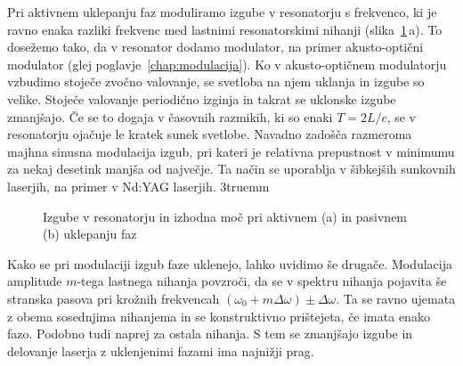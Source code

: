 Pri aktivnem uklepanju faz moduliramo izgube v resonatorju
s frekvenco, ki je ravno enaka razliki 
frekvenc med lastnimi resonatorskimi nihanji (slika~\ref{fig:aktpas}\,a). 
To dosežemo tako, da v resonator dodamo
modulator, na primer akusto-optični modulator (glej poglavje~\ref{chap:modulacija}).
Ko v akusto-optičnem modulatorju vzbudimo stoječe zvočno valovanje, se 
svetloba na njem uklanja in izgube so velike. Stoječe valovanje periodično izginja
in takrat se uklonske izgube zmanjšajo. Če se to dogaja v časovnih
razmikih, ki so enaki $T=2L/c$, se v resonatorju ojačuje le kratek sunek svetlobe. 
Navadno zadošča razmeroma majhna sinusna modulacija izgub, pri kateri je relativna 
prepustnost v minimumu za nekaj desetink manjša od največje. Ta način se uporablja
v šibkejših sunkovnih laserjih, na primer v Nd:YAG laserjih.
\vglue3truemm
\begin{figure}[ht]
\centering
\def\svgwidth{128truemm} 

\caption{Izgube v resonatorju in izhodna moč pri aktivnem (a) in pasivnem (b) uklepanju faz}
\label{fig:aktpas}
\end{figure}

Kako se pri modulaciji izgub faze uklenejo, lahko uvidimo še drugače.
Modulacija amplitude $m$-tega lastnega nihanja povzroči, da se v spektru nihanja
pojavita še stranska pasova pri krožnih frekvencah $(\omega_0 + m\Delta \omega) \pm \Delta\omega$. Ta se ravno ujemata z obema sosednjima nihanjema in se konstruktivno
prištejeta, če imata enako fazo. Podobno tudi naprej za ostala nihanja. 
S tem se zmanjšajo izgube in delovanje laserja z uklenjenimi fazami ima najnižji prag. 

